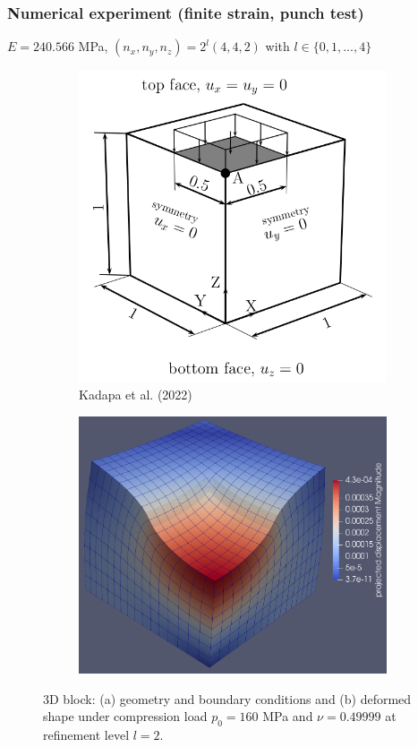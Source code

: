 \documentclass{beamer}
\begin{document}
\begin{frame}
	\frametitle{Numerical experiment (finite strain, punch test)}
	$E=240.566$ MPa, $(n_x, n_y, n_z) = 2^l (4,4,2)$ with $l \in \{0,1, ..., 4 \}$
	\begin{figure}[H]
		\begin{subfigure}{.5\textwidth}
			\centering
			\includegraphics[width=.8\textwidth]{../figs/Punch.png}
			\caption{Kadapa et al. (2022)}
		\end{subfigure}%
		\begin{subfigure}{.5\textwidth}
			\centering
			\includegraphics[width=.8\textwidth]{../figs/Q2P0-160MPa-dm2.png}
			\caption{}
		\end{subfigure}
		\caption{3D block: (a) geometry and boundary conditions and (b) deformed shape under compression load $p_0=160$ MPa and $\nu=0.49999$ at refinement level $l=2$.}
		\label{fig:block-geometry-boundary}
	\end{figure}
\end{frame}
\end{document}
